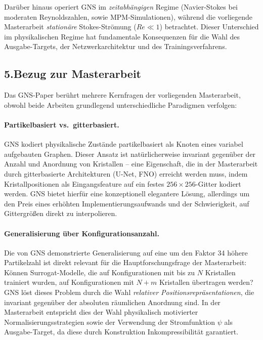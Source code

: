 \documentclass[a4paper,12pt]{article}
\begin{document}
Darüber hinaus operiert GNS im \emph{zeitabhängigen} Regime (Navier-Stokes bei
moderaten Reynoldszahlen, sowie MPM-Simulationen), während die vorliegende
Masterarbeit \emph{stationäre} Stokes-Strömung ($Re \ll 1$) betrachtet. Dieser
Unterschied im physikalischen Regime hat fundamentale Konsequenzen für die
Wahl des Ausgabe-Targets, der Netzwerkarchitektur und des Trainingsverfahrens.

\subsection*{5.\quad Bezug zur Masterarbeit}

Das GNS-Paper berührt mehrere Kernfragen der vorliegenden Masterarbeit, obwohl
beide Arbeiten grundlegend unterschiedliche Paradigmen verfolgen:

\paragraph{Partikelbasiert vs.\ gitterbasiert.}
GNS kodiert physikalische Zustände partikelbasiert als Knoten eines variabel
aufgebauten Graphen. Dieser Ansatz ist natürlicherweise invariant gegenüber der
Anzahl und Anordnung von Kristallen -- eine Eigenschaft, die in der Masterarbeit
durch gitterbasierte Architekturen (U-Net, FNO) erreicht werden muss, indem
Kristallpositionen als Eingangsfeature auf ein festes $256 \times 256$-Gitter
kodiert werden. GNS bietet hierfür eine konzeptionell elegantere Lösung, allerdings
um den Preis eines erhöhten Implementierungsaufwands und der Schwierigkeit, auf
Gittergrößen direkt zu interpolieren.

\paragraph{Generalisierung über Konfigurationsanzahl.}
Die von GNS demonstrierte Generalisierung auf eine um den Faktor 34 höhere
Partikelzahl ist direkt relevant für die Hauptforschungsfrage der Masterarbeit:
Können Surrogat-Modelle, die auf Konfigurationen mit bis zu $N$ Kristallen
trainiert wurden, auf Konfigurationen mit $N + m$ Kristallen übertragen werden?
GNS löst dieses Problem durch die Wahl \emph{relativer Positionsrepräsentationen},
die invariant gegenüber der absoluten räumlichen Anordnung sind. In der Masterarbeit
entspricht dies der Wahl physikalisch motivierter Normalisierungsstrategien sowie
der Verwendung der Stromfunktion $\psi$ als Ausgabe-Target, da diese durch
Konstruktion Inkompressibilität garantiert.
\end{document}
